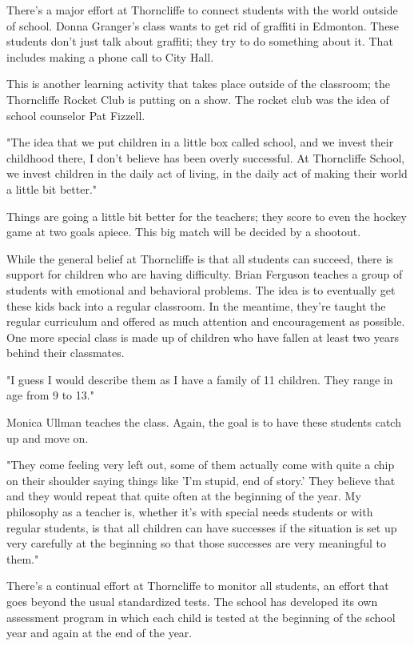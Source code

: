 There's a major effort at Thorncliffe to connect students with the world outside of school. Donna Granger's class wants to get rid of graffiti in Edmonton. These students don't just talk about graffiti; they try to do something about it. That includes making a phone call to City Hall.

This is another learning activity that takes place outside of the classroom; the Thorncliffe Rocket Club is putting on a show. The rocket club was the idea of school counselor Pat Fizzell.

"The idea that we put children in a little box called school, and we invest their childhood there, I don't believe has been overly successful. At Thorncliffe School, we invest children in the daily act of living, in the daily act of making their world a little bit better."

Things are going a little bit better for the teachers; they score to even the hockey game at two goals apiece. This big match will be decided by a shootout.

While the general belief at Thorncliffe is that all students can succeed, there is support for children who are having difficulty. Brian Ferguson teaches a group of students with emotional and behavioral problems. The idea is to eventually get these kids back into a regular classroom. In the meantime, they're taught the regular curriculum and offered as much attention and encouragement as possible. One more special class is made up of children who have fallen at least two years behind their classmates.

"I guess I would describe them as I have a family of 11 children. They range in age from 9 to 13."

Monica Ullman teaches the class. Again, the goal is to have these students catch up and move on.

"They come feeling very left out, some of them actually come with quite a chip on their shoulder saying things like 'I'm stupid, end of story.' They believe that and they would repeat that quite often at the beginning of the year. My philosophy as a teacher is, whether it's with special needs students or with regular students, is that all children can have successes if the situation is set up very carefully at the beginning so that those successes are very meaningful to them."

There's a continual effort at Thorncliffe to monitor all students, an effort that goes beyond the usual standardized tests. The school has developed its own assessment program in which each child is tested at the beginning of the school year and again at the end of the year.

